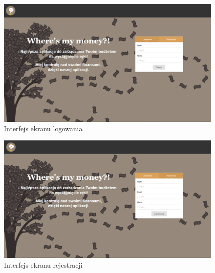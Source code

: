 \documentclass{article}
\begin{document}
	\begin{figure}[H]
		\vspace*{-2cm}
		\hspace*{-2cm}
		\includegraphics[scale=0.45]{assets/mc1.png}
		\caption[]{Interfejs ekranu logowania}
		\label{fig:logowanie}
	\end{figure} 
	\begin{figure}[H]
		\hspace*{-2cm}
		\includegraphics[scale=0.45]{assets/mc2.png}
		\caption[]{Interfejs ekranu rejestracji}
		\label{fig:rejestracja}
	\end{figure} 
\end{document}
